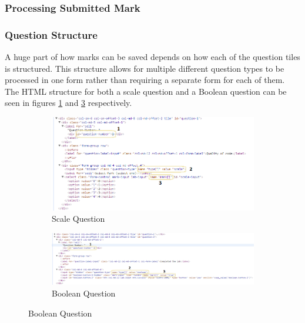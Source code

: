 \documentclass[12pt]{article}  %
\begin{document}
\subsubsection{Processing Submitted Mark}

\subsubsection*{Question Structure}

A huge part of how marks can be saved depends on how each of the question tiles is structured. This structure allows for multiple different question types to be processed in one form rather than requiring a separate form for each of them. The HTML structure for both a scale question and a Boolean question can be seen in figures \ref{fig:struct-scale} and \ref{fig:struct-bool} respectively.  

\begin{figure}[H]
\caption{HTML Structure Of Questions} \label{fig:tile-struct}
\centering
\begin{subfigure}[c]{0.45\textwidth}
    \includegraphics[width=1\textwidth]{images/implementation/question-structure-scale.png}
    \caption{Scale Question}
    \label{fig:struct-scale}
\end{subfigure}
\hfill
\begin{subfigure}[c]{0.45\textwidth}
    \includegraphics[width=1\textwidth]{images/implementation/question-structure-boolean.png}
    \caption{Boolean Question}
    \label{fig:struct-bool}
\end{subfigure}

\end{figure}
\end{document}
